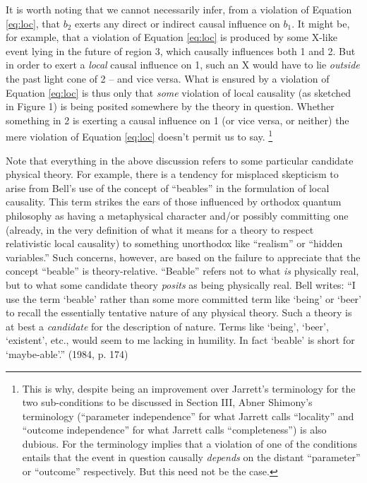 \documentclass[12pt]{article}
\begin{document}
It is worth noting that we cannot necessarily infer, from a violation
of Equation \ref{eq:loc}, that $b_2$ exerts any direct or indirect
causal influence on $b_1$.  It might be, for example,
that a violation of Equation \ref{eq:loc} is produced by some X-like
event lying in the future of region 3, which causally
influences both 1 and 2.  But in order to exert a \emph{local} causal
influence on 1, such an X would have to lie \emph{outside} the past light
cone of 2 -- and vice versa.  What is ensured by a violation of Equation
\ref{eq:loc} is thus only that \emph{some} violation of local
causality (as sketched in Figure 1) is being posited somewhere by the
theory in question.  Whether something in 2 is exerting a causal
influence on 1 (or vice versa, or neither) the mere violation of
Equation \ref{eq:loc} doesn't permit us to say.%
\footnote{This is why, despite being an improvement over Jarrett's
  terminology for the two sub-conditions to be discussed in Section
  III, Abner Shimony's terminology (``parameter independence'' for
  what Jarrett calls ``locality'' and ``outcome independence'' for
  what Jarrett calls ``completeness'') is also dubious.  For the
  terminology implies that a violation of one of the conditions
  entails that the event in question causally \emph{depends} on the distant
  ``parameter'' or ``outcome'' respectively.  But this need not be the
  case.}

Note that
everything in the above discussion refers to some particular candidate
physical theory.  For example, there is a tendency for misplaced
skepticism to arise from Bell's use of the concept of ``beables'' in 
the formulation of local causality.  This term strikes the ears of
those influenced by orthodox quantum philosophy as having a
metaphysical character and/or possibly committing one (already, in the
very definition of what it means for a theory to respect relativistic
local causality) to something unorthodox like ``realism'' or ``hidden
variables.''  Such concerns, however, are based on the failure to 
appreciate that
the concept ``beable'' is theory-relative.  ``Beable'' refers not to
what \emph{is} physically real, but to what some candidate theory
\emph{posits} as being physically real.  Bell writes:
``I use the term
`beable' rather than some more committed term like `being' or `beer'
to recall the essentially tentative nature of any physical theory.
Such a theory is at best a \emph{candidate} for the description of
nature.  Terms like `being', `beer', `existent', etc., would seem to
me lacking in humility.  In fact `beable' is short for `maybe-able'.''
(1984, p. 174)
\end{document}
